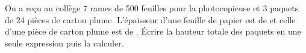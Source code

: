 \begin{exercice*}
   On a reçu au collège 7 rames de 500 feuilles pour la photocopieuse et 3 paquets de 24 pièces de carton plume. L'épaisseur d'une feuille de papier est de  et celle d'une pièce de carton plume est de . Écrire la hauteur totale des paquets en une seule expression puis la calculer.
\end{exercice*}
 